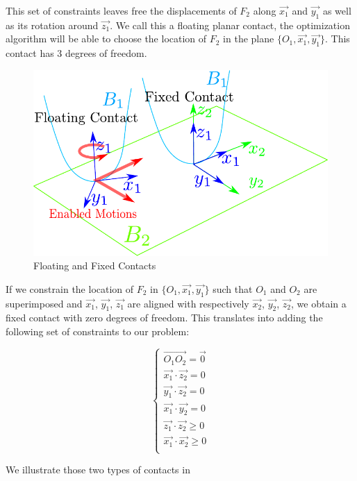 This set of constraints leaves free the displacements of $F_2$ along $\vec{x_1}$ and $\vec{y_1}$ as well as its rotation around $\vec{z_1}$.
We call this a floating planar contact, the optimization algorithm will be able to choose the location of $F_2$ in the plane $\{O_1, \vec{x_1}, \vec{y_1}\}$.
This contact has 3 degrees of freedom.

\begin{figure}[htpb]
  \centering
  \includegraphics[width=0.8\linewidth]{contactConstraint.pdf}
  \caption{Floating and Fixed Contacts}
\label{fig:contactConstraint}
\end{figure}

If we constrain the location of $F_2$ in $\{O_1, \vec{x_1}, \vec{y_1}\}$ such that $O_1$ and $O_2$ are superimposed and $\vec{x_1}$, $\vec{y_1}$, $\vec{z_1}$ are aligned with respectively $\vec{x_2}$, $\vec{y_2}$, $\vec{z_2}$, we obtain a fixed contact with zero degrees of freedom.
This translates into adding the following set of constraints to our problem:

\begin{equation}
\label{eq:fixed_contact}
\boxed{\left\{
  \begin{array}{l}
    \overrightarrow{O_1O_2} = \vec{0}\\
    \vec{x_1}\cdot\vec{z_2} = 0\\
    \vec{y_1}\cdot\vec{z_2} = 0\\
    \vec{x_1}\cdot\vec{y_2} = 0\\
    \vec{z_1}\cdot\vec{z_2} \geq 0\\
    \vec{x_1}\cdot\vec{x_2} \geq 0\\
  \end{array}
  \right.}
\end{equation}

We illustrate those two types of contacts in~



